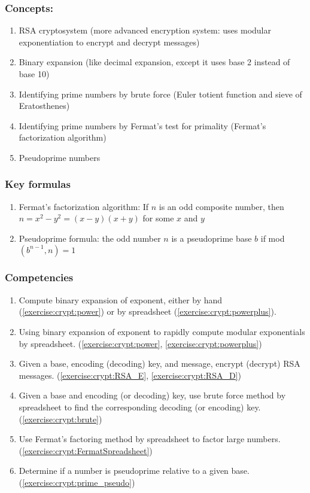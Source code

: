 \subsubsection*{Concepts:}
\begin{enumerate}
\item 
RSA cryptosystem (more advanced encryption system: uses modular exponentiation to encrypt and decrypt messages)
\item
Binary expansion (like decimal expansion, except it uses base 2 instead of base 10)
\item
Identifying prime numbers by brute force (Euler totient function and sieve of Eratosthenes)
\item
Identifying prime numbers by Fermat’s test for primality (Fermat’s factorization algorithm)
\item
Pseudoprime numbers
\end{enumerate}

\subsubsection*{Key formulas}
\begin{enumerate}
\item
Fermat’s factorization algorithm: If $n$ is an odd composite number, then $n = x^{2} - y^{2} = (x - y)(x + y)$ for some $x$ and $y$
\item
Pseudoprime formula: the odd number $n$ is a pseudoprime base $b$ if mod$(b^{n-1},n) = 1$
\end{enumerate}

\subsubsection*{Competencies}
\begin{enumerate}
\item
Compute binary expansion of exponent, either by hand (\ref{exercise:crypt:power}) or by spreadsheet (\ref{exercise:crypt:powerplus}).
\item
Using binary expansion of exponent to rapidly compute modular exponentials by spreadsheet. (\ref{exercise:crypt:power}, \ref{exercise:crypt:powerplus})
\item
Given a base, encoding (decoding) key, and message, encrypt (decrypt) RSA messages. (\ref{exercise:crypt:RSA_E}, \ref{exercise:crypt:RSA_D})
\item
Given a base and encoding (or decoding) key, use brute force method by spreadsheet to find the corresponding decoding (or encoding) key. (\ref{exercise:crypt:brute})
\item
Use Fermat’s factoring method by spreadsheet to factor large numbers. (\ref{exercise:crypt:FermatSpreadsheet})
\item
Determine if a number is pseudoprime relative to a given base. (\ref{exercise:crypt:prime_pseudo})
\end{enumerate}